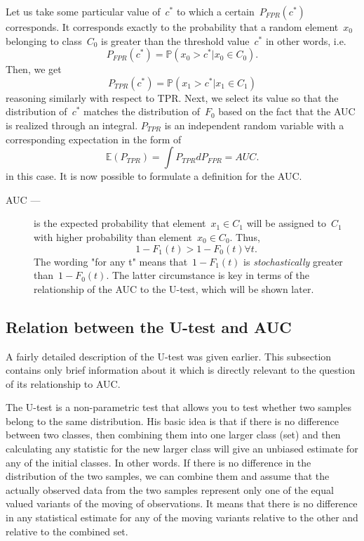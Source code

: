 \documentclass[]{scrreprt}
\begin{document}
Let us take some particular value of~$c^{*}$ to which a certain~$P_{FPR}(c^{*})$ corresponds. It corresponds exactly to the probability that a random element~$x_{0}$ belonging to class~$C_{0}$ is greater than the threshold value~$c^{*}$ in other words, i.e.
\begin{equation}\label{eq:AUC-computation-3}
P_{FPR}(c^{*}) = \mathbb{P}(x_{0}>c^{*}|x_{0} \in C_{0}).
\end{equation}
Then, we get
\begin{equation}\label{eq:AUC-computation-4}
P_{TPR}(c^{*}) = \mathbb{P}(x_{1}>c^{*}|x_{1} \in C_{1})
\end{equation}
reasoning similarly with respect to TPR. Next, we select its value so that the distribution of~$c^{*}$ matches the distribution of~$F_{0}$ based on the fact that the AUC is realized through an integral. $P_{TPR}$ is an independent random variable with a corresponding expectation in the form of
\begin{equation}\label{eq:AUC-computation-integral}
\mathbb{E}(P_{TPR}) = \int P_{TPR} d P_{FPR} = AUC.
\end{equation}
in this case. It is now possible to formulate a definition for the AUC.
\begin{description}
	\item[AUC ---] is the expected probability that element~$x_{1} \in C_{1}$ will be assigned to~$C_{1}$ with higher probability than element~$x_{0} \in C_{0}$. Thus,
	\begin{equation}\label{eq:AUC-definition}
	1-F_{1}(t)>1-F_{0}(t) \forall t.
	\end{equation}
	The wording "for any t" means that~$1-F_{1}(t)$ is \emph{stochastically} greater than~$1-F_{0}(t)$. The latter circumstance is key in terms of the relationship of the AUC to the U-test, which will be shown later.
\end{description}
%
\subsection{Relation between the U-test and AUC}\label{U-test&AUC-relation}
A fairly detailed description of the U-test was given earlier. This subsection contains only brief information about it which is directly relevant to the question of its relationship to AUC.

The U-test is a non-parametric test that allows you to test whether two samples belong to the same distribution. His basic idea is that if there is no difference between two classes, then combining them into one larger class (set) and then calculating any statistic for the new larger class will give an unbiased estimate for any of the initial classes. In other words. If there is no difference in the distribution of the two samples, we can combine them and assume that the actually observed data from the two samples represent only one of the equal valued variants of the moving of observations. It means that there is no difference in any statistical estimate for any of the moving variants relative to the other and relative to the combined set.
\end{document}
